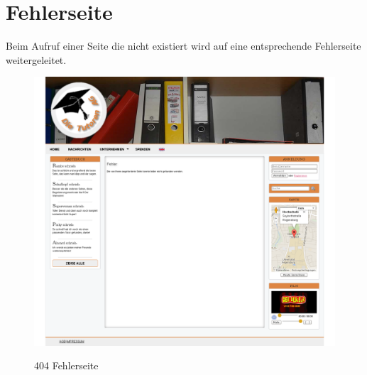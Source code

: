 \section{Fehlerseite}

Beim Aufruf einer Seite die nicht existiert wird auf eine entsprechende Fehlerseite weitergeleitet.

\begin{figure}[!htbp]
 \centering
 \includegraphics[width=1\textwidth]{../Screenshots/de/404}
 \label{fig:404}
 \caption{404 Fehlerseite}
\end{figure}